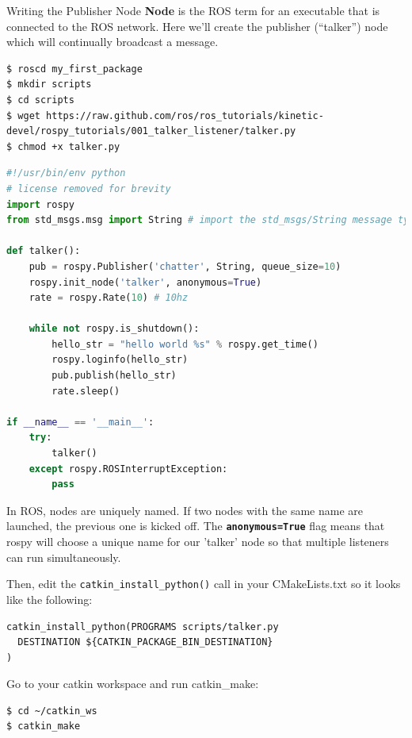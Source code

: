 \begin{frame}{Writing the Publisher Node}
\textbf{Node} is the ROS term for an executable that is connected to the ROS network. Here we'll create the publisher (``talker'') node which will continually broadcast a message.

\begin{lstlisting}[language=shell]
$ roscd my_first_package
$ mkdir scripts
$ cd scripts
$ wget https://raw.github.com/ros/ros_tutorials/kinetic-devel/rospy_tutorials/001_talker_listener/talker.py
$ chmod +x talker.py
\end{lstlisting}

\begin{lstlisting}[language=python]
#!/usr/bin/env python
# license removed for brevity
import rospy
from std_msgs.msg import String # import the std_msgs/String message type

def talker():
    pub = rospy.Publisher('chatter', String, queue_size=10)
    rospy.init_node('talker', anonymous=True)
    rate = rospy.Rate(10) # 10hz
    
    while not rospy.is_shutdown():
        hello_str = "hello world %s" % rospy.get_time()
        rospy.loginfo(hello_str)
        pub.publish(hello_str)
        rate.sleep()

if __name__ == '__main__':
    try:
        talker()
    except rospy.ROSInterruptException:
        pass
\end{lstlisting}

In ROS, nodes are uniquely named. If two nodes with the same name are launched, the previous one is kicked off. The \textbf{\texttt{anonymous=True}} flag means that rospy will choose a unique name for our 'talker' node so that multiple listeners can run simultaneously.

\framebreak

Then, edit the \texttt{catkin\_install\_python()} call in your CMakeLists.txt so it looks like the following:

\begin{lstlisting}[language=syntax]
catkin_install_python(PROGRAMS scripts/talker.py
  DESTINATION ${CATKIN_PACKAGE_BIN_DESTINATION}
)
\end{lstlisting}

Go to your catkin workspace and run catkin\_make:
\begin{lstlisting}[language=shell]
$ cd ~/catkin_ws
$ catkin_make
\end{lstlisting}
\end{frame}

